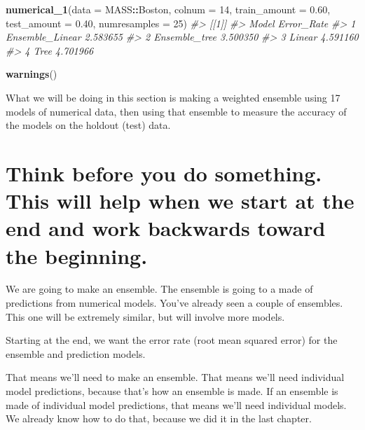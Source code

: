 \documentclass[
]{book}
\newenvironment{Shaded}{\begin{snugshade}}{\end{snugshade}}
\newcommand{\AttributeTok}[1]{\textcolor[rgb]{0.13,0.29,0.53}{#1}}
\newcommand{\CommentTok}[1]{\textcolor[rgb]{0.56,0.35,0.01}{\textit{#1}}}
\newcommand{\DecValTok}[1]{\textcolor[rgb]{0.00,0.00,0.81}{#1}}
\newcommand{\FloatTok}[1]{\textcolor[rgb]{0.00,0.00,0.81}{#1}}
\newcommand{\FunctionTok}[1]{\textcolor[rgb]{0.13,0.29,0.53}{\textbf{#1}}}
\newcommand{\NormalTok}[1]{#1}
\newcommand{\SpecialCharTok}[1]{\textcolor[rgb]{0.81,0.36,0.00}{\textbf{#1}}}
\begin{document}
\begin{Shaded}
\begin{Highlighting}[]
\FunctionTok{numerical\_1}\NormalTok{(}\AttributeTok{data =}\NormalTok{ MASS}\SpecialCharTok{::}\NormalTok{Boston, }\AttributeTok{colnum =} \DecValTok{14}\NormalTok{, }\AttributeTok{train\_amount =} \FloatTok{0.60}\NormalTok{, }\AttributeTok{test\_amount =} \FloatTok{0.40}\NormalTok{, }\AttributeTok{numresamples =} \DecValTok{25}\NormalTok{)}
\CommentTok{\#\textgreater{} [[1]]}
\CommentTok{\#\textgreater{}             Model Error\_Rate}
\CommentTok{\#\textgreater{} 1 Ensemble\_Linear   2.583655}
\CommentTok{\#\textgreater{} 2   Ensemble\_tree   3.500350}
\CommentTok{\#\textgreater{} 3          Linear   4.591160}
\CommentTok{\#\textgreater{} 4            Tree   4.701966}
\end{Highlighting}
\end{Shaded}

\begin{Shaded}
\begin{Highlighting}[]

\FunctionTok{warnings}\NormalTok{()}
\end{Highlighting}
\end{Shaded}

What we will be doing in this section is making a weighted ensemble
using 17 models of numerical data, then using that ensemble to measure
the accuracy of the models on the holdout (test) data.

\section{Think before you do something. This will help when we start at the end and work backwards toward the beginning.}\label{think-before-you-do-something.-this-will-help-when-we-start-at-the-end-and-work-backwards-toward-the-beginning.}

We are going to make an ensemble. The ensemble is going to a made of
predictions from numerical models. You've already seen a couple of
ensembles. This one will be extremely similar, but will involve more
models.

Starting at the end, we want the error rate (root mean squared error)
for the ensemble and prediction models.

That means we'll need to make an ensemble. That means we'll need
individual model predictions, because that's how an ensemble is made. If
an ensemble is made of individual model predictions, that means we'll
need individual models. We already know how to do that, because we did
it in the last chapter.
\end{document}
